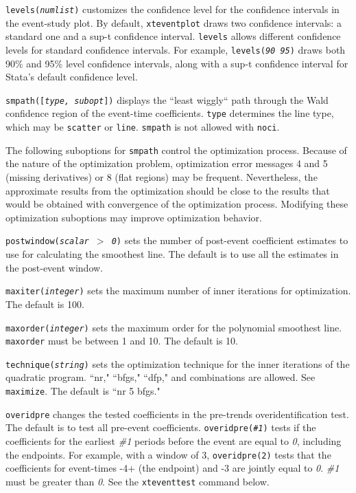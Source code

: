 \documentclass[12pt]{article}
\begin{document}
\hangpara
\texttt{levels({\it numlist})} customizes the confidence level for the confidence intervals in the event-study plot.
By default, \texttt{xteventplot} draws two confidence intervals: a standard one and a sup-t confidence interval.
\texttt{levels} allows different confidence levels for standard confidence intervals.
For example, \texttt{levels({\it 90 95})} draws both 90\% and 95\% level confidence intervals, along with a sup-t confidence interval for Stata's default confidence level.

\hangpara
\texttt{smpath([{\it type, subopt}])} displays the ``least wiggly`` path through the Wald confidence region of the event-time coefficients.
\texttt{type} determines the line type, which may be \texttt{scatter} or \texttt{line}.
\texttt{smpath} is not allowed with \texttt{noci}.

\hangpara
The following suboptions for \texttt{smpath} control the optimization process. Because of the nature of the optimization problem, optimization error messages 4 and 5 (missing derivatives) or 8 (flat regions) may be frequent. Nevertheless, the approximate results from the optimization should be close to the results that would be obtained with convergence of the optimization process. Modifying these optimization suboptions may improve optimization behavior.

\morehangpara
\texttt{postwindow({\it scalar $>$ 0})} sets the number of post-event coefficient estimates to use for calculating the smoothest line.
The default is to use all the estimates in the post-event window.

\morehangpara
\texttt{maxiter({\it integer})} sets the maximum number of inner iterations for optimization.
The default is 100.

\morehangpara
\texttt{maxorder({\it integer})} sets the maximum order for the polynomial smoothest line.
\texttt{maxorder} must be between 1 and 10. The default is 10.

\morehangpara
\texttt{technique({\it string})} sets the optimization technique for the inner iterations of the quadratic program. ``nr," ``bfgs," ``dfp," and combinations are allowed. See {\tt maximize}. The default is ``nr 5 bfgs."

\hangpara
\texttt{overidpre} changes the tested coefficients in the pre-trends overidentification test.
The default is to test all pre-event coefficients.
\texttt{overidpre({\it \#1})} tests if the coefficients for the earliest {\it \#1} periods before the event are equal to {\it 0}, including the endpoints.
For example, with a window of 3, \texttt{overidpre(2)} tests that the coefficients for event-times -4+ (the endpoint) and -3 are jointly equal to {\it 0}.
{\it \#1} must be greater than {\it 0}.
See the \texttt{xteventtest} command below.
\end{document}
